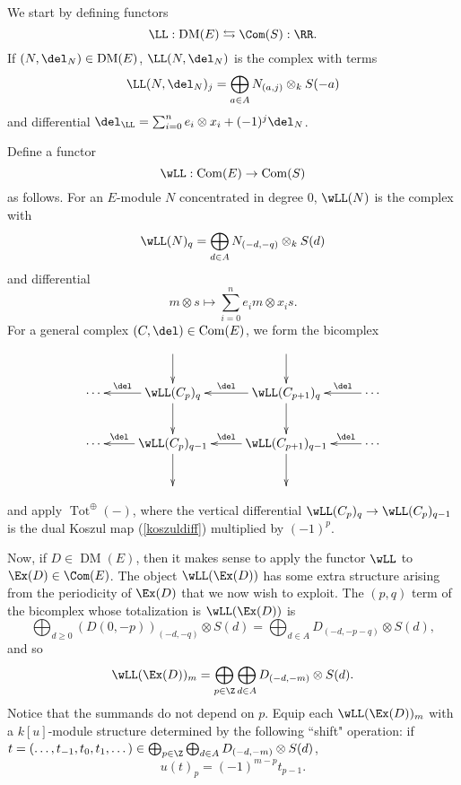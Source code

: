 \documentclass[12pt]{amsart}
\theoremstyle{definition}
\theoremstyle{remark}
\newcommand{\ZZ}{\mathbb Z}
\newcommand{\daniel}[1]{{\color{blue} \sf $\clubsuit\clubsuit\clubsuit$ Daniel: [#1]}}
\def\on{\operatorname}
\def\DM{\operatorname{DM}}
\begin{document}
\iffalse
In the BGG correspondence for the standard $\ZZ$-graded polynomial ring, there are adjoint functors $\RR$ and $\LL$, which give equivalences of categories between $D(S)$ and $D(E)$.  

Famously, under the functor $\RR$,  the standard $\ZZ$-grading of the $S$-modules becomes the homological grading on $D(E)$ side, and the homological grading on $D(S)$ becomes the $\ZZ$-grading of the $E$-modules.  (A similar statement holds for $\LL$.)

Things are more subtle if $S$ has a nonstandard grading, though a similar exchange still holds.  In this section, we will define adjoint functors $\RR$ and $\LL$ which give equivalences of categories between the derived category of $S$-modules and the derived category of differen \daniel{got interrupted while editing\dots}
\fi
We start by defining functors
$$
\LL : \DM(E) \leftrightarrows \Com(S) : \RR.
$$
If $(N, \del_N) \in \DM(E)$, $\LL(N, \del_N)$ is the complex with terms
$$
\LL(N, \del_N)_j = \bigoplus_{a \in A} N_{(a, j)} \otimes_k S(-a)
$$
and differential $\del_{\LL} = \sum_{i = 0}^n e_i \otimes x_i + (-1)^j \del_N$. 


\iffalse
Define a functor
$$
\wLL : \on{Com}(E) \to \on{Com}(S)
$$
as follows. For an $E$-module $N$ concentrated in degree 0, $\wLL(N)$ is the complex with
$$
\wLL(N)_q = \bigoplus_{d \in A} N_{(-d, -q)} \otimes_k S(d)
$$ 
and differential
\begin{equation}
\label{koszuldiff}
m \otimes s \mapsto \sum_{i = 0}^n e_im \otimes x_is.
\end{equation}
For a general complex $(C, \del) \in \on{Com}(E)$, we form the bicomplex
\begin{equation}
\label{bicomplex}
\xymatrix{ 
& \ar[d] & \ar[d]  & \\
\cdots & \wLL(C_{p})_{q}\ar[l]_-{ \del}  \ar[d]     & \wLL(C_{p + 1})_q   \ar[d] \ar[l]_-{ \del} & \cdots \ar[l]_-{\del} \\
\cdots & \wLL(C_{p })_{q- 1} \ar[d] \ar[l]_-{\del} &  \wLL(C_{p+1})_{q-1} \ar[d] \ar[l]_-{\del} & \ar[l]_-{\del}  \cdots \\
&&&
}
\end{equation}
and apply $\on{Tot}^{\oplus}( - )$, where the vertical differential $ \wLL(C_{p})_{q} \to  \wLL(C_{p})_{q-1}$ is the dual Koszul map (\ref{koszuldiff}) multiplied by $(-1)^p$. 

Now, if $D \in \DM(E)$, then it makes sense to apply the functor $\wLL$ to $\Ex(D) \in \Com(E)$. The object $\wLL(\Ex(D))$ has some extra structure arising from the periodicity of $\Ex(D)$ that we now wish to exploit. The $(p,q)$ term of the bicomplex whose totalization is $\wLL(\Ex(D))$ is 
$$
\bigoplus_{d \ge 0} (D(0, -p))_{(-d, -q)} \otimes S(d) = \bigoplus_{d \in A} D_{(-d, -p-q)} \otimes S(d),
$$
and so
$$
\wLL(\Ex(D))_m = \bigoplus_{p \in \Z}  \bigoplus_{d \in A} D_{(-d, -m)} \otimes S(d).
$$
Notice that the summands do not depend on $p$. Equip each $\wLL(\Ex(D))_m$ with a $k[u]$-module structure determined by the following ``shift" operation: if $t = (\dots, t_{-1}, t_0, t_1, \dots) \in \bigoplus_{p \in \Z}  \bigoplus_{d \in A} D_{(-d, -m)} \otimes S(d)$,
$$
u(t)_p = (-1)^{m - p} t_{p - 1}. 
$$
\end{document}
